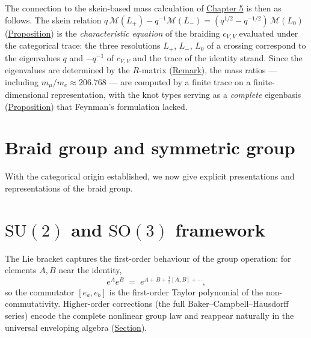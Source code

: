 \begin{remark}
The connection to the skein-based mass calculation of
\hyperref[chap:experimental]{Chapter 5} is then as follows.  The skein relation
$q\,\mathcal{M}(L_+) - q^{-1}\mathcal{M}(L_-) =
(q^{1/2} - q^{-1/2})\,\mathcal{M}(L_0)$
(\hyperref[prop:skein-mass-relation]{Proposition}) is the
\emph{characteristic equation} of the braiding $c_{V,V}$ evaluated under
the categorical trace: the three resolutions $L_+$, $L_-$, $L_0$ of a
crossing correspond to the eigenvalues $q$ and $-q^{-1}$ of $c_{V,V}$
and the trace of the identity strand.  Since the eigenvalues are
determined by the $R$-matrix (\hyperref[rem:r-matrix-braiding]{Remark}), the
mass ratios --- including $m_\mu/m_e \approx 206.768$ --- are computed by
a finite trace on a finite-dimensional representation, with the knot types
serving as a \emph{complete} eigenbasis
(\hyperref[prop:knot-eigenbasis-complete]{Proposition}) that Feynman's
formulation lacked.
\end{remark}

\section{Braid group and symmetric group}
\label{sec:braid-symmetric}

With the categorical origin established, we now give explicit presentations
and representations of the braid group.

\section{$\mathrm{SU}(2)$ and $\mathrm{SO}(3)$ framework}
\label{sec:su2-so3}



\begin{remark}
  \label{rem:first-order-taylor}
The Lie bracket captures the first-order
behaviour of the group operation: for elements $A,B$ near the identity,
\[
e^A e^B \;=\; e^{A+B+\tfrac{1}{2}[A,B]+\cdots},
\]
so the commutator $[e_a,e_b]$ is the first-order Taylor polynomial of
the non-commutativity.  Higher-order corrections (the full
Baker--Campbell--Hausdorff series) encode the complete nonlinear group
law and reappear naturally in the universal enveloping algebra
(\hyperref[sec:enveloping-algebras]{Section}).
\end{remark}

